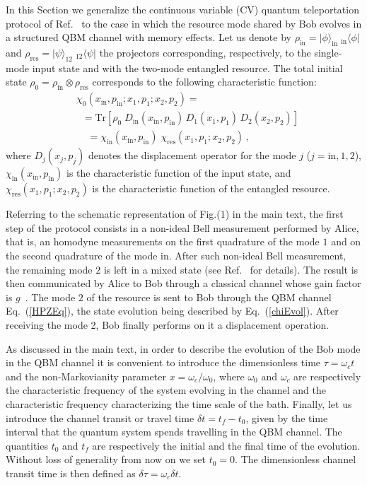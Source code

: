 \documentclass[prl,twocolumn,aps,floatfix,showpacs,tightenlines,superscriptaddress,amsmath,amssymb,amsfonts,10pt]{revtex4-1}
\begin{document}
In this Section we generalize the continuous variable (CV) quantum teleportation protocol of Ref.~\cite{PhysRevA.81.012333} to the case in which the resource mode shared by Bob evolves in a structured QBM channel with memory effects. Let us denote by $\rho_{\textrm{in}}=|\phi\rangle_{\textrm{in}}\;_{\textrm{in}}{\langle\phi|}$ and $\rho_{\textrm{res}}=|\psi\rangle_{12}\;_{12}{\langle\psi|}$ the projectors corresponding, respectively, to the single-mode input state and with the two-mode entangled resource. The total initial state
$\rho_{0}=\rho_{\textrm{in}} \otimes \rho_{\textrm{res}}$ corresponds to the following characteristic function:
\begin{align}
&\chi_{0}(x_{\textrm{in}},p_{\textrm{in}};x_{1},p_{1};x_{2},p_{2})= \nonumber \\
&\;\; =\textrm{Tr}[\rho_{0} \;
D_{\textrm{in}}(x_{\textrm{in}},p_{\textrm{in}})\, D_{1}(x_{1},p_{1})\, D_{2}(x_{2},p_{2})]
\nonumber \\
&\;\;\;\;= \chi_{\textrm{in}}(x_{\textrm{in}},p_{\textrm{in}})\; \chi_{\textrm{res}}(x_{1},p_{1};x_{2},p_{2})  \,,
\label{globcharfuncinitial}
\end{align}
where $D_{j}(x_{j},p_j)$ denotes the displacement operator for the mode $j$ ($j=\textrm{in},1,2$), $\chi_{\textrm{in}}(x_{\textrm{in}},p_{\textrm{in}})$ is the characteristic function of the input state, and $\chi_{\textrm{res}}(x_{1},p_{1};x_{2},p_{2})$ is the characteristic function of the entangled resource.

Referring to the schematic representation of Fig.(1) in the main text, the first step of the protocol consists in a non-ideal Bell measurement performed by Alice, that is, an homodyne measurements on the first quadrature of the mode $1$ and on the second quadrature of the mode $\textrm{in}$.
After such non-ideal Bell measurement, the remaining mode $2$ is left in a mixed state (see Ref.~\cite{PhysRevA.81.012333} for details). The result is then communicated by Alice to Bob through a classical channel whose gain factor is $g$~\cite{PhysRevA.81.012333}.
The mode $2$ of the resource is sent to Bob through the QBM channel Eq.~(\ref{HPZEq}), the state evolution being described by Eq.~(\ref{chiEvol}). After receiving the mode 2, Bob finally performs on it a displacement operation.

As discussed in the main text, in order to describe the evolution of the Bob mode in the QBM channel it is convenient to introduce the dimensionless time $\tau=\omega_c t$ and the non-Markovianity parameter $x=\omega_c/\omega_0$, where $\omega_0$ and $\omega_c$ are respectively the characteristic frequency of the system evolving in the channel and the characteristic frequency characterizing the time scale of the bath. Finally, let us introduce the channel transit or travel time $\delta t=t_f-t_0$, given by the time interval that the quantum system spends travelling in the QBM channel. The quantities $t_0$ and $t_f$ are respectively the initial and the final time of the evolution. Without loss of generality from now on we set $t_0=0$. The dimensionless channel transit time is then defined as $\delta\tau = \omega_c\delta t$.
\end{document}

